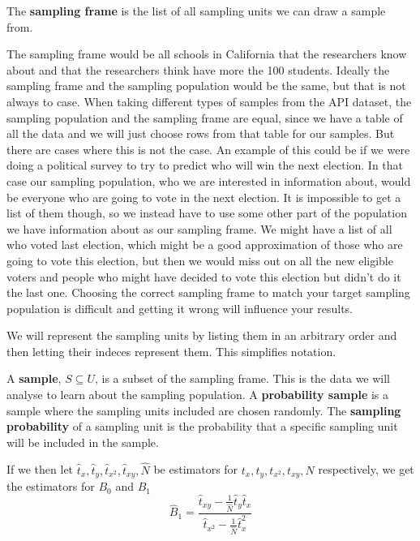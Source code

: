 \documentclass{article}
\begin{document}
\begin{definition} \label{def:sampFrame}
 The \textbf{sampling frame} is the list of all sampling units we can draw a
 sample from.
\end{definition}

The sampling frame would be all schools in California that the researchers know
about and that the researchers think have more the 100 students.
Ideally the sampling frame and the sampling population would be the same, but that is not always to case.
When taking different types of samples from the API dataset, the sampling population and the sampling frame are equal, since
we have a table of all the data and we will just choose rows from that table for
our samples. But there are cases where this is not the case. An example of this
could be if we were doing a political survey to try to predict who will win the
next election.
In that case our sampling population, who we are interested in information
about, would be everyone who are going to vote in the next election. It is
impossible to get a list of them though, so we instead have to use 
some other part of the population we have information about as our sampling frame. We might have a
list of all who voted last election, which might be a good approximation of
those who are going to vote this election, but then we would miss out on all the
new eligible voters and people who might have decided to vote this election but
didn't do it the last one.
Choosing the correct sampling frame to match your target sampling population is
difficult and getting it wrong will influence your results.

We will represent the sampling units by listing them in an arbitrary order and
then letting their indeces represent them. This simplifies notation.


\begin{definition} \label{def:sample}
A \textbf{sample}, \(S \subseteq U\), is a subset of the sampling frame. This is the data we will analyse to learn about the sampling population.
A \textbf{probability sample} is a sample where the sampling units included are chosen randomly.
The \textbf{sampling probability} of a sampling unit is the probability that a
specific sampling unit will be included in the sample.
\end{definition}


If we then let \(\hat{t}_x, \hat{t}_y, \hat{t}_{x^2}, \hat{t}_{xy}, \hat{N}\) be estimators
for \(t_x, t_y, t_{x^2},
t_{xy}, N\) respectively, we get the estimators for \(B_0\) and \(B_1\)
\begin{equation*}
 \hat{B}_1 = \frac{\hat{t}_{xy} - \frac{1}{\widehat{N}} \hat{t}_y \hat{t}_x}
   {\hat{t}_{x^2} - \frac{1}{\widehat{N}} \hat{t}_x^2}
\end{equation*}
\end{document}
